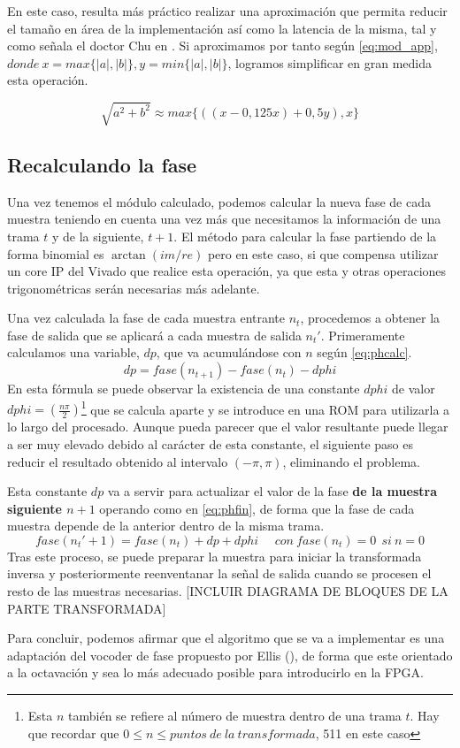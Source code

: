 En este caso, resulta más práctico realizar una aproximación que permita reducir el tamaño en área de la implementación así como la latencia de la misma, tal y como señala el doctor Chu en \cite{vhdlchu}. Si aproximamos por tanto según \ref{eq:mod_app}, $donde~x = max\{|a|,|b|\}, y = min\{|a|,|b|\}$, logramos simplificar en gran medida esta operación.

\begin{equation}
\label{eq:mod_app}
 \sqrt{a^{2}+b^{2}} \approx max\{((x - 0,125x) + 0,5y),x\}
\end{equation} 

\subsection{Recalculando la fase}
Una vez tenemos el módulo calculado, podemos calcular la nueva fase de cada muestra teniendo en cuenta una vez más que necesitamos la información de una trama $t$ y de la siguiente, $t+1$. El método para calcular la fase partiendo de la forma binomial es $\arctan(im/re)$ pero en este caso, si que compensa utilizar un core IP del Vivado que realice esta operación, ya que esta y otras operaciones trigonométricas serán necesarias más adelante.

Una vez calculada la fase de cada muestra entrante $n_{t}$, procedemos a obtener la fase de salida que se aplicará a cada muestra de salida $n_{t}'$. Primeramente calculamos una variable, $dp$, que va acumulándose con $n$ según \ref{eq:phcalc}. 
\begin{equation}
\label{eq:phcalc}
dp = fase(n_{t+1}) - fase(n_{t}) - dphi
\end{equation} 
En esta fórmula se puede observar la existencia de una constante $dphi$ de valor $dphi = (\frac{n\pi}{2})$\footnote{Esta $n$ también se refiere al número de muestra dentro de una trama $t$. Hay que recordar que $0 \leq n \leq puntos~de~la~transformada$, 511 en este caso} que se calcula aparte y se introduce en una ROM para utilizarla a lo largo del procesado. Aunque pueda parecer que el valor resultante puede llegar a ser muy elevado debido al carácter de esta constante, el siguiente paso es reducir el resultado obtenido al intervalo $(-\pi,\pi)$, eliminando el problema.

Esta constante $dp$ va a servir para actualizar el valor de la fase \textbf{de la muestra siguiente $n+1$} operando como en \ref{eq:phfin}, de forma que la fase de cada muestra depende de la anterior dentro de la misma trama.
\begin{equation}
\label{eq:phfin}
fase(n_{t}' + 1) = fase(n_{t}) + dp + dphi~~~~~~con~fase(n_{t}) = 0~~si~n=0
\end{equation} 
Tras este proceso, se puede preparar la muestra para iniciar la transformada inversa y posteriormente reenventanar la señal de salida cuando se procesen el resto de las muestras necesarias. [INCLUIR DIAGRAMA DE BLOQUES DE LA PARTE TRANSFORMADA]

Para concluir, podemos afirmar que el algoritmo que se va a implementar es una adaptación del vocoder de fase propuesto por Ellis (\cite{Ellis}), de forma que este orientado a la octavación y sea lo más adecuado posible para introducirlo en la FPGA.